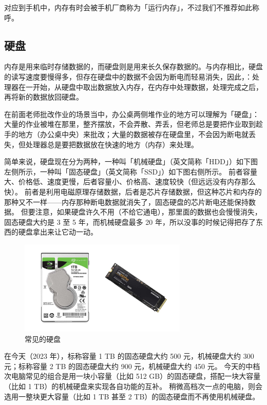 \begin{note}
  对应到手机中，内存有时会被手机厂商称为「运行内存」，不过我们不推荐如此称呼。
\end{note}

\subsection{硬盘}

内存是用来临时存储数据的，而硬盘则是用来长久保存数据的。与内存相比，硬盘的读写速度要慢得多，但存在硬盘中的数据不会因为断电而轻易消失，因此，：处理器在一开始，从硬盘中取出数据放入内存，在内存中处理数据，处理完成之后，再将新的数据放回硬盘。

在前面老师批改作业的场景当中，办公桌两侧堆作业的地方可以理解为「硬盘」：大量的作业被堆在那里，整齐摆放，不会弄散、弄丢，但老师总是要把作业取到趁手的地方（办公桌中央）来批改；大量的数据被存在硬盘里，不会因为断电就丢失，但处理器总是要把数据放在快速的地方（内存）来处理。

简单来说，硬盘现在分为两种，一种叫「机械硬盘」（英文简称「HDD」）如下图左侧所示，一种叫「固态硬盘」（英文简称「SSD」）如下图右侧所示。
前者容量大、价格低、速度更慢，后者容量小、价格高、速度较快（但远远没有内存那么快）。
前者是利用电磁原理存储数据，后者是芯片存储数据，但这种芯片和内存的那种又不一样——内存那种断电数据就消失了，固态硬盘的芯片断电还能保持数据。
但要注意，如果硬盘许久不用（不给它通电），那里面的数据也会慢慢消失，固态硬盘大约是 3 至 5 年，而机械硬盘最多 20 年，所以没事的时候记得把存了东西的硬盘拿出来让它动一动。

\begin{figure}[H]
  \centering
  \includegraphics[width=8cm]{assets/Disks.jpg}
  \caption{常见的硬盘}
  \label{disks}
\end{figure}

在今天（2023 年），标称容量 1 TB 的固态硬盘大约 500 元，机械硬盘大约 300 元；标称容量 2 TB 的固态硬盘大约 900 元，机械硬盘大约 450 元。
今天的中档次电脑常见的组合是用一块小容量（比如 512 GB）的固态硬盘，搭配一块大容量（比如 1 TB）的机械硬盘来实现各自功能的互补。
稍微高档次一点的电脑，则会选用一整块更大容量（比如 1 TB 甚至 2 TB）的固态硬盘而不再使用机械硬盘。

